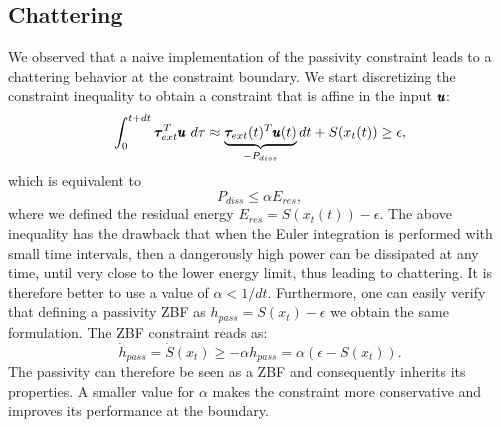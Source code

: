 \subsection{Chattering}
We observed that a naive implementation of the passivity constraint leads to a chattering behavior at the constraint boundary. We start discretizing the constraint inequality to obtain a constraint that is affine in the input $\pmb{u}$:
\begin{equation*}
    \int_{0}^{t + dt} \boldsymbol{\tau}_{ext}^T \pmb{u} \ d\tau \approx \underbrace{\boldsymbol{\tau}_{ext}(t)^T \pmb{u}(t) }_{-P_{diss}}dt + S(x_t(t)) \geq \epsilon,
\end{equation*}
which is equivalent to 
\begin{equation} \label{eq:passivity_simple}
    P_{diss} \leq \alpha E_{res},
\end{equation}
where we defined the residual energy $E_{res} = S(x_t(t))-\epsilon$. The above inequality has the drawback that when the Euler integration is performed with small time intervals, then a dangerously high power can be dissipated at any time, until very close to the lower energy limit, thus leading to chattering. It is therefore better to use a value of $\alpha < 1/dt$. Furthermore, one can easily verify that defining a passivity ZBF as $h_{pass} = S(x_t) - \epsilon$ we obtain the same formulation. The ZBF constraint reads as:
\begin{equation*}
    \dot{h}_{pass} = \dot{S}(x_t) \geq -\alpha h_{pass}
     =\alpha (\epsilon - S(x_t)).
\end{equation*}
The passivity can therefore be seen as a ZBF and consequently inherits its properties. A smaller value for $\alpha$ makes the constraint more conservative and improves its performance at the boundary. 

